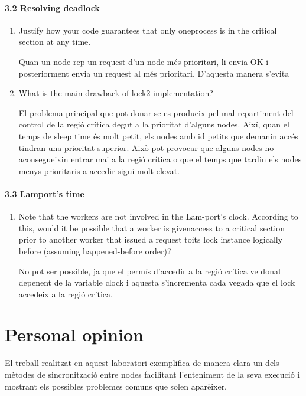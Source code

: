 \documentclass[a4paper, 10pt]{article}
\begin{document}
\paragraph[bold]{3.2 Resolving deadlock}
\begin{enumerate}
\item Justify how your code guarantees that only oneprocess is in the critical section at any time.
\begin{flushleft}
Quan un node rep un request d'un node més prioritari, li envia OK i posteriorment envia un request al més prioritari.
D'aquesta manera s'evita

\end{flushleft}

\item What is the main drawback of lock2 implementation?
\begin{flushleft}
El problema principal que pot donar-se es produeix pel mal repartiment del control de la regió
crítica degut a la prioritat d'alguns nodes. Així, quan el temps de sleep time és molt petit,
els nodes amb id petits que demanin accés tindran una prioritat superior. Això pot provocar que alguns
nodes no aconsegueixin entrar mai a la regió crítica o que el temps que tardin els nodes menys prioritaris a accedir
sigui molt elevat.

\end{flushleft}


\end{enumerate}

\paragraph[bold]{3.3 Lamport's time}
\begin{enumerate}
\item Note that the workers are not involved in the Lam-port’s clock.  According to this, would it be possible that a worker is givenaccess to a critical section prior to another worker that issued a request toits lock instance logically before (assuming happened-before order)?
\begin{flushleft}
No pot ser possible, ja que el permís d'accedir a la regió crítica ve donat depenent de la variable clock i aquesta s'incrementa
cada vegada que el lock accedeix a la regió crítica.

\end{flushleft}

\end{enumerate}

\newpage
\section{Personal opinion}
\begin{flushleft}
El treball realitzat en aquest laboratori exemplifica de manera clara un dels mètodes de sincronització entre nodes
facilitant l'enteniment de la seva execució i mostrant els possibles problemes comuns que solen aparèixer.

\end{flushleft}
\end{document}
